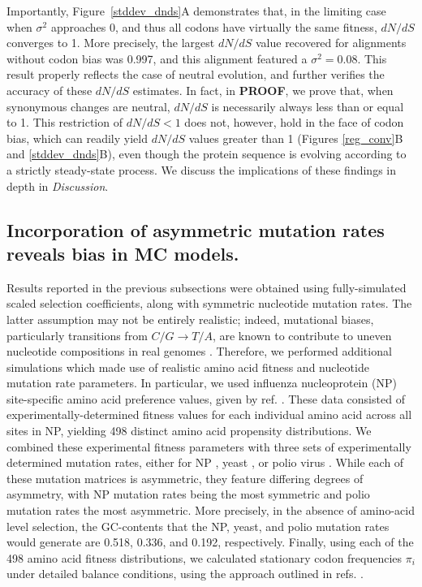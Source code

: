 \documentclass{pnastwo}
\begin{document}
\begin{article}
Importantly, Figure~\ref{stddev_dnds}A demonstrates that, in the limiting case when $\sigma^2$ approaches 0, and thus all codons have virtually the same fitness, $dN/dS$ converges to 1. More precisely, the largest $dN/dS$ value recovered for alignments without codon bias was 0.997, and this alignment featured a $\sigma^2 = 0.08$. This result properly reflects the case of neutral evolution, and further verifies the accuracy of these $dN/dS$ estimates. In fact, in \textbf{PROOF}, we prove that, when synonymous changes are neutral, $dN/dS$ is necessarily always less than or equal to 1.  This restriction of $dN/dS < 1$ does not, however, hold in the face of codon bias, which can readily yield $dN/dS$ values greater than 1 (Figures \ref{reg_conv}B and \ref{stddev_dnds}B), even though the protein sequence is evolving according to a strictly steady-state process. We discuss the implications of these findings in depth in \textit{Discussion}.


\subsection*{Incorporation of asymmetric mutation rates reveals bias in MC models.}

Results reported in the previous subsections were obtained using fully-simulated scaled selection coefficients, along with symmetric nucleotide mutation rates. The latter assumption may not be entirely realistic; indeed, mutational biases, particularly transitions from $C/G \rightarrow T/A$, are known to contribute to uneven nucleotide compositions in real genomes \cite{Hernandez2007,HershbergPetrov2010,Zhu2014,Acevedo2014}. Therefore, we performed additional simulations which made use of realistic amino acid fitness and nucleotide mutation rate parameters. In particular, we used influenza nucleoprotein (NP) site-specific amino acid preference values, given by ref. \cite{Bloom2014a}. These data consisted of experimentally-determined fitness values for each individual amino acid across all sites in NP, yielding 498 distinct amino acid propensity distributions. We combined these experimental fitness parameters with three sets of experimentally determined mutation rates, either for NP \cite{Bloom2014a}, yeast \cite{Zhu2014}, or polio virus \cite{Acevedo2014}. While each of these mutation matrices is asymmetric, they feature differing degrees of asymmetry, with NP mutation rates being the most symmetric and polio mutation rates the most asymmetric. More precisely, in the absence of amino-acid level selection, the GC-contents that the NP, yeast, and polio mutation rates would generate are 0.518, 0.336, and 0.192, respectively. Finally, using each of the 498 amino acid fitness distributions, we calculated stationary codon frequencies $\pi_i$ under detailed balance conditions, using the approach outlined in refs. \cite{Bloom2014a,Bloom2014b}. 


\end{article}
\end{document}
